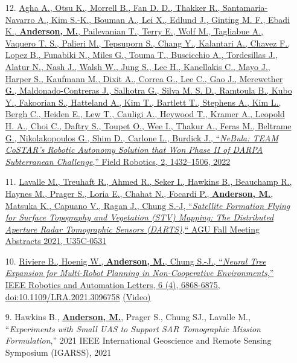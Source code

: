\documentclass[12pt,letter,sans]{moderncv}
\begin{document}
\begin{itemize}
    \item [12.] \href{https://arxiv.org/abs/2103.11470}
    {Agha A., Otsu K., Morrell B., Fan D. D., Thakker R., Santamaria-Navarro A., Kim S.-K., Bouman A., Lei X., Edlund J., Ginting M. F., Ebadi K., \underline{\textbf{Anderson, M.}}, Pailevanian T., Terry E., Wolf M., Tagliabue A., Vaquero T. S., Palieri M., Tepsuporn S., Chang Y., Kalantari A., Chavez F., Lopez B., Funabiki N., Miles G., Touma T., Buscicchio A., Tordesillas J., Alatur N., Nash J., Walsh W., Jung S., Lee H., Kanellakis C., Mayo J., Harper S., Kaufmann M., Dixit A., Correa G., Lee C., Gao J., Merewether G., Maldonado-Contreras J., Salhotra G., Silva M. S. D., Ramtoula B., Kubo Y., Fakoorian S., Hatteland A., Kim T., Bartlett T., Stephens A., Kim L., Bergh C., Heiden E., Lew T., Cauligi A., Heywood T., Kramer A., Leopold H. A., Choi C., Daftry S., Toupet O., Wee I., Thakur A., Feras M., Beltrame G., Nikolakopoulos G., Shim D., Carlone L., Burdick J., ``\textit{NeBula: TEAM CoSTAR’s Robotic Autonomy Solution that Won Phase II of DARPA Subterranean Challenge},'' Field Robotics, 2, 1432–1506, 2022}

    \item [11.] \href{https://www.researchgate.net/publication/355255608_Distributed_Aperture_Radar_Tomographic_Sensors_DARTS_to_Map_Surface_Topography_and_Vegetation_Structure}
    {Lavalle M., Treuhaft R., Ahmed R., Seker I., Hawkins B., Beauchamp R., Haynes M., Prager S., Loria E., Chahat N., Focardi P., \underline{\textbf{Anderson, M.}}, Matsuka K., Capuano V., Ragan J., Chung S.-J, ``\textit{Satellite Formation Flying for Surface Topography and Vegetation (STV) Mapping: The Distributed Aperture Radar Tomographic Sensors (DARTS)},`` AGU Fall Meeting Abstracts 2021, U35C-0531}
    
    \item [10.] \href{https://arxiv.org/pdf/2104.09705}
    {Riviere B., Hoenig W., \underline{\textbf{Anderson, M.}}, Chung S.-J., ``\textit{Neural Tree Expansion for Multi-Robot Planning in Non-Cooperative Environments},''  IEEE Robotics and Automation Letters, 6 (4), 6868-6875, doi:10.1109/LRA.2021.3096758}
    \href{https://youtu.be/tkmTYUWnAOw?si=qUoDkA8bU4YgKJ3H}{(Video)}
    
    \item [9.] Hawkins B., \underline{\textbf{Anderson, M.}}, Prager S., Chung SJ., Lavalle M., ``\textit{Experiments with Small UAS to Support SAR Tomographic Mission Formulation},'' 2021 IEEE International Geoscience and Remote Sensing Symposium (IGARSS), 2021
    

\end{itemize}
\end{document}
